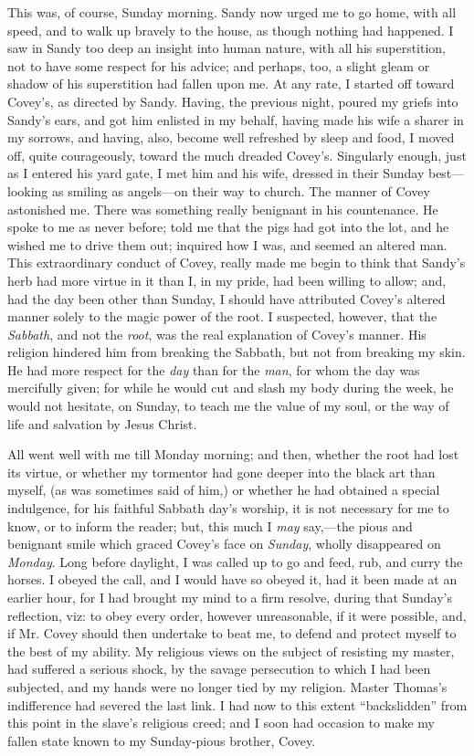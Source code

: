 This was, of course, Sunday morning. Sandy now urged me to go home, with
all speed, and to walk up bravely to the house, as though nothing had
happened. I saw in Sandy too deep an insight into {}human nature, with
all his superstition, not to have some respect for his advice; and
perhaps, too, a slight gleam or shadow of his superstition had fallen
upon me. At any rate, I started off toward Covey's, as directed by
Sandy. Having, the previous night, poured my griefs into Sandy's ears,
and got him enlisted in my behalf, having made his wife a sharer in my
sorrows, and having, also, become well refreshed by sleep and food, I
moved off, quite courageously, toward the much dreaded Covey's.
Singularly enough, just as I entered his yard gate, I met him and his
wife, dressed in their Sunday best---looking as smiling as angels---on
their way to church. The manner of Covey astonished me. There was
something really benignant in his countenance. He spoke to me as never
before; told me that the pigs had got into the lot, and he wished me to
drive them out; inquired how I was, and seemed an altered man. This
extraordinary conduct of Covey, really made me begin to think that
Sandy's herb had more virtue in it than I, in my pride, had been willing
to allow; and, had the day been other than Sunday, I should have
attributed Covey's altered manner solely to the magic power of the root.
I suspected, however, that the \emph{Sabbath}, and not the \emph{root},
was the real explanation of Covey's manner. His religion hindered him
from breaking the Sabbath, but not from breaking my skin. He had more
respect for the \emph{day} than for the \emph{man}, for whom the day was
mercifully given; for while he would cut and slash my body during the
week, he would not hesitate, on Sunday, to teach me the value {}of my
soul, or the way of life and salvation by Jesus Christ.

All went well with me till Monday morning; and then, whether the root
had lost its virtue, or whether my tormentor had gone deeper into the
black art than myself, (as was sometimes said of him,) or whether he had
obtained a special indulgence, for his faithful Sabbath day's worship,
it is not necessary for me to know, or to inform the reader; but, this
much I \emph{may} say,---the pious and benignant smile which graced
Covey's face on \emph{Sunday}, wholly disappeared on \emph{Monday}. Long
before daylight, I was called up to go and feed, rub, and curry the
horses. I obeyed the call, and I would have so obeyed it, had it been
made at an earlier hour, for I had brought my mind to a firm resolve,
during that Sunday's reflection, viz: to obey every order, however
unreasonable, if it were possible, and, if Mr. Covey should then
undertake to beat me, to defend and protect myself to the best of my
ability. My religious views on the subject of resisting my master, had
suffered a serious shock, by the savage persecution to which I had been
subjected, and my hands were no longer tied by my religion. Master
Thomas's indifference had severed the last link. I had now to this
extent ``backslidden'' from this point in the slave's religious creed;
and I soon had occasion to make my fallen state known to my Sunday-pious
brother, Covey.

